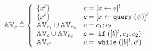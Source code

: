 \begin{defn}
\label{def:avar}
{\footnotesize
$$ \avar_{c} \triangleq
  \left\{
  \begin{array}{ll}
      \{{x}^l\}                   
      & {c} = [{\assign x e}]^{l} 
      \\
      \{{x}^l\}                   
      & {c} = [{\assign x \query(\qexpr)}]^{l} 
      \\
      \avar_{{c_1}} \cup \avar_{{c_2}}  
      & {c} = {c_1};{c_2}
      \\
      \avar_{{c}} \cup \avar_{{c_2}} 
      & {c} =\eif([\bexpr]^{l}, c_1, c_2) 
      \\
      \avar_{{c}'}
      & {c}   = \ewhile ([\bexpr]^{l}, {c}')
\end{array}
\right.
$$
}
\end{defn}
%

